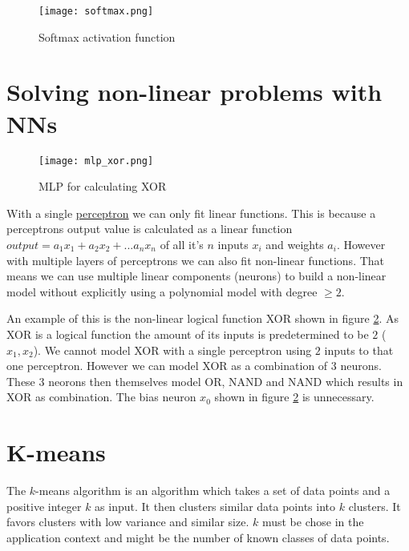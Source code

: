 \begin{figure}[h]
    \centering
    \texttt{[image: softmax.png]}
    \caption{Softmax activation function}
    \label{fig:softmax}
\end{figure}

\section{Solving non-linear problems with NNs}

\label{sec:solving_non_linear_problems_with_nns}

\begin{figure}[h]
    \centering
    \texttt{[image: mlp\_xor.png]}
    \caption{MLP for calculating XOR}
    \label{fig:mlp_xor}
\end{figure}

With a single \hyperref[sec:mlp]{perceptron} we can only fit linear functions. This is because a perceptrons output value is calculated as a linear function $output = a_{1} x_{1} + a_{2} x_{2} + ... a_{n} x_{n}$ of all it's $n$ inputs $x_{i}$ and weights $a_{i}$. However with multiple layers of perceptrons we can also fit non-linear functions. That means we can use multiple linear components (neurons) to build a non-linear model without explicitly using a polynomial model with degree $\geq 2$.

An example of this is the non-linear logical function XOR shown in figure \ref{fig:mlp_xor}. As XOR is a logical function the amount of its inputs is predetermined to be $2$ ($x_{1}, x_{2}$). We cannot model XOR with a single perceptron using $2$ inputs to that one perceptron. However we can model XOR as a combination of 3 neurons. These 3 neorons then themselves model OR, NAND and NAND which results in XOR as combination. The bias neuron $x_{0}$ shown in figure \ref{fig:mlp_xor} is unnecessary.

\section{K-means}

The $k$-means algorithm is an algorithm which takes a set of data points and a positive integer $k$ as input. It then clusters similar data points into $k$ clusters. It favors clusters with low variance and similar size. $k$ must be chose in the application context and might be the number of known classes of data points.\\


